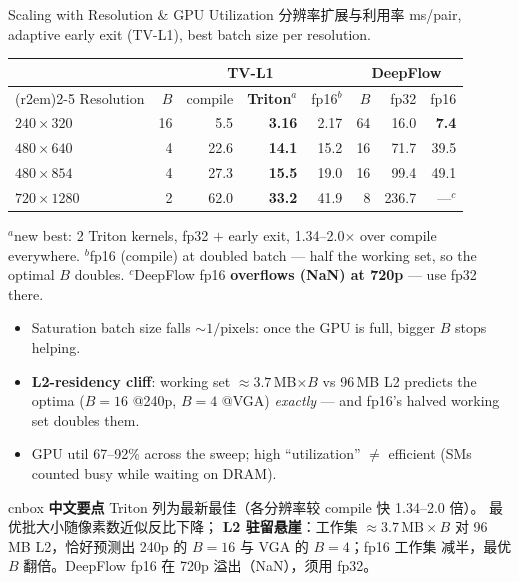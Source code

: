\documentclass[aspectratio=169,10pt]{beamer}
\newcommand{\zh}[1]{{\zhfont #1}}
\newenvironment{cn}{%
  \begin{beamercolorbox}[rounded=true,sep=4pt,wd=\textwidth]{cnbox}\zhfont\footnotesize
  {\color{cblue!70!black}\textbf{中文要点}}\quad}%
  {\end{beamercolorbox}}
\begin{document}
\begin{frame}{Scaling with Resolution \& GPU Utilization \zh{分辨率扩展与利用率}}
  \centering
  {\small ms/pair, adaptive early exit (TV-L1), best batch size per
   resolution.}
  \par
  {\footnotesize
  \begin{tabular}{@{}lrrrr@{\qquad}rrr@{}}
    \toprule
    & \multicolumn{4}{c}{TV-L1} & \multicolumn{3}{c}{DeepFlow} \\
    \cmidrule(r{2em}){2-5}\cmidrule{6-8}
    Resolution & $B$ & compile & \textbf{Triton}$^{a}$ & fp16$^{b}$
               & $B$ & fp32 & fp16 \\
    \midrule
    $240{\times}320$  & 16 & 5.5  & \textbf{3.16} & 2.17 & 64 & 16.0  & \textbf{7.4} \\
    $480{\times}640$  &  4 & 22.6 & \textbf{14.1} & 15.2 & 16 & 71.7  & 39.5 \\
    $480{\times}854$  &  4 & 27.3 & \textbf{15.5} & 19.0 & 16 & 99.4  & 49.1 \\
    $720{\times}1280$ &  2 & 62.0 & \textbf{33.2} & 41.9 &  8 & 236.7 & ---$^{c}$ \\
    \bottomrule
  \end{tabular}}
  \par\smallskip
  {\scriptsize $^{a}$new best: 2 Triton kernels, fp32 $+$ early exit,
   1.34--2.0$\times$ over compile everywhere.\quad
   $^{b}$fp16 (compile) at doubled batch --- half the working set, so the
   optimal $B$ doubles.\quad
   $^{c}$DeepFlow fp16 \textbf{overflows (NaN) at 720p} --- use fp32 there.}
  \par
  \begin{itemize}\itemsep1pt\small
    \item Saturation batch size falls $\sim 1/\text{pixels}$: once the GPU is
      full, bigger $B$ stops helping.
    \item \textbf{L2-residency cliff}: working set $\approx 3.7$\,MB$\times B$
      vs 96\,MB L2 predicts the optima ($B{=}16$ @240p, $B{=}4$ @VGA)
      \emph{exactly} --- and fp16's halved working set doubles them.
    \item GPU util 67--92\% across the sweep; high ``utilization'' $\ne$
      efficient (SMs counted busy while waiting on DRAM).
  \end{itemize}
  \vfill
  \begin{cn}
    Triton 列为最新最佳（各分辨率较 compile 快 1.34--2.0 倍）。
    最优批大小随像素数近似反比下降；
    \textbf{L2 驻留悬崖}：工作集 $\approx 3.7\,\mathrm{MB}\times B$ 对
    96 MB L2，恰好预测出 240p 的 $B{=}16$ 与 VGA 的 $B{=}4$；fp16 工作集
    减半，最优 $B$ 翻倍。DeepFlow fp16 在 720p 溢出（NaN），须用 fp32。
  \end{cn}
\end{frame}
\end{document}
